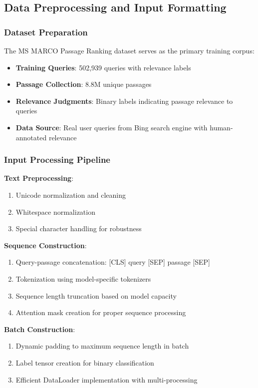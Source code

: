 \subsection{Data Preprocessing and Input Formatting}

\subsubsection{Dataset Preparation}

The MS MARCO Passage Ranking dataset \cite{DBLP:journals/corr/NguyenRSGTMD16} serves as the primary training corpus:

\begin{itemize}
    \item \textbf{Training Queries}: 502,939 queries with relevance labels
    \item \textbf{Passage Collection}: 8.8M unique passages
    \item \textbf{Relevance Judgments}: Binary labels indicating passage relevance to queries
    \item \textbf{Data Source}: Real user queries from Bing search engine with human-annotated relevance
\end{itemize}

\subsubsection{Input Processing Pipeline}

\textbf{Text Preprocessing}:
\begin{enumerate}
    \item Unicode normalization and cleaning
    \item Whitespace normalization
    \item Special character handling for robustness
\end{enumerate}

\textbf{Sequence Construction}:
\begin{enumerate}
    \item Query-passage concatenation: [CLS] query [SEP] passage [SEP]
    \item Tokenization using model-specific tokenizers
    \item Sequence length truncation based on model capacity
    \item Attention mask creation for proper sequence processing
\end{enumerate}

\textbf{Batch Construction}:
\begin{enumerate}
    \item Dynamic padding to maximum sequence length in batch
    \item Label tensor creation for binary classification
    \item Efficient DataLoader implementation with multi-processing
\end{enumerate}

